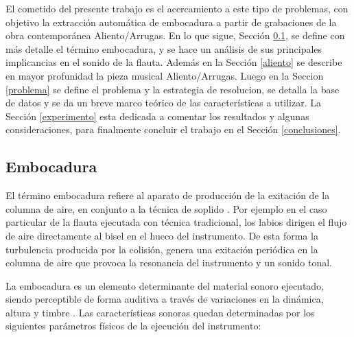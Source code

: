 \documentclass{article}
\begin{document}
El cometido del presente trabajo es el acercamiento a este tipo de problemas, con objetivo la extracción automática de embocadura a partir de grabaciones de la obra contemporánea Aliento/Arrugas. En lo que sigue, Sección \ref{embocadura}, se define con más detalle el término embocadura, y se hace un análisis de sus principales implicancias en el sonido de la flauta. Además en la Sección \ref{aliento} se describe en mayor profunidad la pieza musical Aliento/Arrugas. Luego en la Seccion \ref{problema} se define el problema y la estrategia de resolucion, se detalla la base de datos y se da un breve marco teórico de las características a utilizar. La Sección \ref{experimento} esta dedicada a comentar los resultados y algunas consideraciones, para finalmente concluir el trabajo en el Sección \ref{conclusiones}.

\subsection{Embocadura}
\label{embocadura}
El término embocadura refiere al aparato de producción de la exitación de la columna de aire, en conjunto a la técnica de soplido \citep[Capítulo~6]{piston1955orchestration}. Por ejemplo en el caso particular de la flauta ejecutada con técnica tradicional, los labios dirigen el flujo de aire directamente al bisel en el hueco del instrumento. De esta forma la turbulencia producida por la colisión, genera una exitación periódica en la columna de aire que provoca la resonancia del instrumento y un sonido tonal. 
\medskip

La embocadura es un elemento determinante del material sonoro ejecutado, siendo perceptible de forma auditiva a través de variaciones en la dinámica, altura y timbre \citep[Capítulo~2]{dick1975other}. Las características sonoras quedan determinadas por los siguientes parámetros físicos de la ejecución del instrumento:
\end{document}
